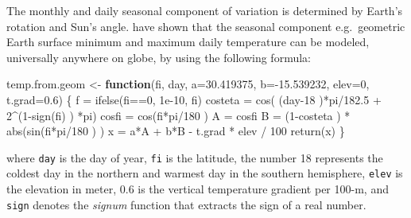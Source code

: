 \documentclass[
  graybox,natbib,nospthms]{svmono}
\newenvironment{Shaded}{\begin{snugshade}}{\end{snugshade}}
\newcommand{\AttributeTok}[1]{\textcolor[rgb]{0.61,0.61,0.61}{#1}}
\newcommand{\ControlFlowTok}[1]{\textcolor[rgb]{0.27,0.27,0.27}{\textbf{#1}}}
\newcommand{\DecValTok}[1]{\textcolor[rgb]{0.06,0.06,0.06}{#1}}
\newcommand{\FloatTok}[1]{\textcolor[rgb]{0.06,0.06,0.06}{#1}}
\newcommand{\FunctionTok}[1]{\textcolor[rgb]{0,0,0}{#1}}
\newcommand{\NormalTok}[1]{#1}
\newcommand{\OtherTok}[1]{\textcolor[rgb]{0.37,0.37,0.37}{#1}}
\newcommand{\SpecialCharTok}[1]{\textcolor[rgb]{0,0,0}{#1}}
\begin{document}
The monthly and daily seasonal component of variation is determined by Earth's rotation
and Sun's angle. \citet{kilibarda2014spatio} have shown that the seasonal
component e.g.~geometric Earth surface minimum and maximum daily temperature
can be modeled, universally anywhere on globe, by using the following formula:

\begin{Shaded}
\begin{Highlighting}[]
\NormalTok{temp.from.geom }\OtherTok{\textless{}{-}} \ControlFlowTok{function}\NormalTok{(fi, day, }\AttributeTok{a=}\FloatTok{30.419375}\NormalTok{, }
                           \AttributeTok{b=}\SpecialCharTok{{-}}\FloatTok{15.539232}\NormalTok{, }\AttributeTok{elev=}\DecValTok{0}\NormalTok{, }\AttributeTok{t.grad=}\FloatTok{0.6}\NormalTok{) \{}
\NormalTok{  f }\OtherTok{=} \FunctionTok{ifelse}\NormalTok{(fi}\SpecialCharTok{==}\DecValTok{0}\NormalTok{, }\FloatTok{1e{-}10}\NormalTok{, fi)}
\NormalTok{  costeta }\OtherTok{=} \FunctionTok{cos}\NormalTok{( (day}\DecValTok{{-}18}\NormalTok{ )}\SpecialCharTok{*}\NormalTok{pi}\SpecialCharTok{/}\FloatTok{182.5} \SpecialCharTok{+} \DecValTok{2}\SpecialCharTok{\^{}}\NormalTok{(}\DecValTok{1}\SpecialCharTok{{-}}\FunctionTok{sign}\NormalTok{(fi) ) }\SpecialCharTok{*}\NormalTok{pi) }
\NormalTok{  cosfi }\OtherTok{=} \FunctionTok{cos}\NormalTok{(fi}\SpecialCharTok{*}\NormalTok{pi}\SpecialCharTok{/}\DecValTok{180}\NormalTok{ )}
\NormalTok{  A }\OtherTok{=}\NormalTok{ cosfi}
\NormalTok{  B }\OtherTok{=}\NormalTok{ (}\DecValTok{1}\SpecialCharTok{{-}}\NormalTok{costeta ) }\SpecialCharTok{*} \FunctionTok{abs}\NormalTok{(}\FunctionTok{sin}\NormalTok{(fi}\SpecialCharTok{*}\NormalTok{pi}\SpecialCharTok{/}\DecValTok{180}\NormalTok{ ) )}
\NormalTok{  x }\OtherTok{=}\NormalTok{ a}\SpecialCharTok{*}\NormalTok{A }\SpecialCharTok{+}\NormalTok{ b}\SpecialCharTok{*}\NormalTok{B }\SpecialCharTok{{-}}\NormalTok{ t.grad }\SpecialCharTok{*}\NormalTok{ elev }\SpecialCharTok{/} \DecValTok{100}
  \FunctionTok{return}\NormalTok{(x)}
\NormalTok{\}}
\end{Highlighting}
\end{Shaded}

where \texttt{day} is the day of year, \texttt{fi} is the latitude, the number 18 represents
the coldest day in the northern and warmest day in the southern hemisphere,
\texttt{elev} is the elevation in meter, 0.6 is the vertical temperature gradient per
100-m, and \texttt{sign} denotes the \emph{signum} function that extracts the sign of a real number.
\end{document}
